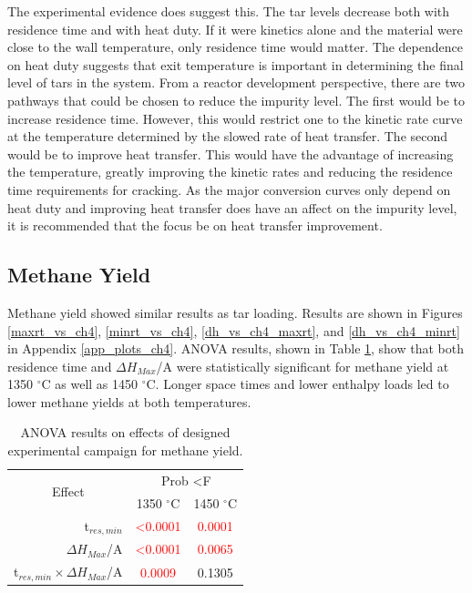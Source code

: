 \documentclass[11pt,twocolumn]{article}
\begin{document}
The experimental evidence does suggest this.  The tar levels decrease both with residence time and with heat duty.  If it were kinetics alone and the material were close to the wall temperature, only residence time would matter.  The dependence on heat duty suggests that exit temperature is important in determining the final level of tars in the system.  From a reactor development perspective, there are two pathways that could be chosen to reduce the impurity level.  The first would be to increase residence time.  However, this would restrict one to the kinetic rate curve at the temperature determined by the slowed rate of heat transfer.  The second would be to improve heat transfer.  This would have the advantage of increasing the temperature, greatly improving the kinetic rates and reducing the residence time requirements for cracking.  As the major conversion curves only depend on heat duty and improving heat transfer does have an affect on the impurity level, it is recommended that the focus be on heat transfer improvement. 


\subsection*{Methane Yield}

Methane yield showed similar results as tar loading.  Results are shown in Figures \ref{maxrt_vs_ch4}, \ref{minrt_vs_ch4}, \ref{dh_vs_ch4_maxrt}, and \ref{dh_vs_ch4_minrt} in Appendix \ref{app_plots_ch4}.  ANOVA results, shown in Table \ref{anova_ch4}, show that both residence time and $\Delta H_{Max}$/A were statistically significant for methane yield at 1350  $^\circ$C as well as 1450  $^\circ$C.  Longer space times and lower enthalpy loads led to lower methane yields at both temperatures.

\begin{table}
	\centering
	\caption{ANOVA results on effects of designed experimental campaign for methane yield.}
	\begin{tabular}{r c c}
		\toprule
		\multicolumn{1}{c}{\multirow{2}{*}{Effect}}		& 	\multicolumn{2}{c}{Prob \textless F	}	\\
		{}								&	1350 $^\circ$C	&	1450 $^\circ$C			\\
		\midrule
		t$_{res,min}$						&	\textcolor{red}{\textless 0.0001}	&	\textcolor{red}{0.0001}	\\
		$\Delta H_{Max}$/A					&	\textcolor{red}{\textless 0.0001}	&	\textcolor{red}{0.0065}	\\
		t$_{res,min}\times \Delta H_{Max}$/A	&	\textcolor{red}{0.0009}			&	0.1305				\\
		\bottomrule
	\end{tabular}
	\label{anova_ch4}
\end{table}
 
\end{document}
